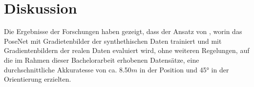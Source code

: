 
\section{Diskussion}
\label{sec:kapitel_5}
Die Ergebnisse der Forschungen haben gezeigt, dass der Ansatz von \citet{acharyaBIMPoseNetIndoorCamera2019}, worin das PoseNet mit Gradietenbilder der synthethischen Daten trainiert und mit Gradientenbildern der realen Daten evaluiert wird, ohne weiteren Regelungen, auf die im Rahmen dieser Bachelorarbeit erhobenen Datensätze, eine durchschnittliche Akkuratesse von ca. 8.50$m$ in der Position und 45° in der Orientierung erzielten.